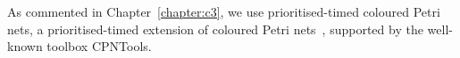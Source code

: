 


As commented in Chapter~\ref{chapter:c3}, we use prioritised-timed coloured Petri nets, 
a prioritised-timed extension of coloured Petri nets~\cite{Jensen2009},
supported by the well-known toolbox CPNTools\cite{CPNTools}.

